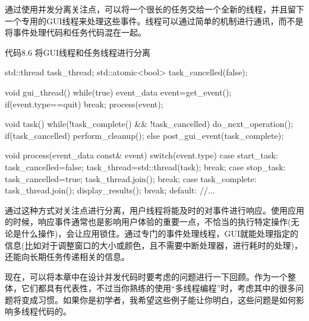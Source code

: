 通过使用并发分离关注点，可以将一个很长的任务交给一个全新的线程，并且留下一个专用的GUI线程来处理这些事件。线程可以通过简单的机制进行通讯，而不是将事件处理代码和任务代码混在一起。

代码8.6 将GUI线程和任务线程进行分离

\begin{cpp}
std::thread task_thread;
std::atomic<bool> task_cancelled(false);

void gui_thread()
{
  while(true)
  {
    event_data event=get_event();
    if(event.type==quit)
      break;
    process(event);
  }
}

void task()
{
  while(!task_complete() && !task_cancelled)
  {
    do_next_operation();
  }
  if(task_cancelled)
  {
    perform_cleanup();
  }
  else
  {
    post_gui_event(task_complete);
  }
}

void process(event_data const& event)
{
  switch(event.type)
  {
  case start_task:
    task_cancelled=false;
    task_thread=std::thread(task);
    break;
  case stop_task:
    task_cancelled=true;
    task_thread.join();
    break;
  case task_complete:
    task_thread.join();
    display_results();
    break;
  default:
    //...
  }
}
\end{cpp}

通过这种方式对关注点进行分离，用户线程将能及时的对事件进行响应。使用应用的时候，响应事件通常也是影响用户体验的重要一点，不恰当的执行特定操作(无论是什么操作)，会让应用锁住。通过专门的事件处理线程，GUI就能处理指定的信息(比如对于调整窗口的大小或颜色，且不需要中断处理器，进行耗时的处理)，还能向长期任务传递相关的信息。

现在，可以将本章中在设计并发代码时要考虑的问题进行一下回顾。作为一个整体，它们都具有代表性，不过当你熟练的使用“多线程编程”时，考虑其中的很多问题将变成习惯。如果你是初学者，我希望这些例子能让你明白，这些问题是如何影响多线程代码的。


